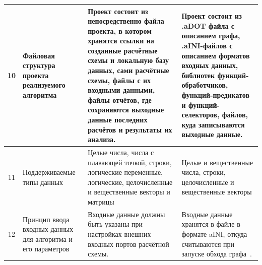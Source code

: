 \begin{landscape}
\begin{longtable}{|c|p{}|p{}|p{}|}
    \hline
    10         & Файловая структура проекта реализуемого алгоритма                                          & Проект состоит из непосредственно файла проекта, в котором хранятся ссылки на созданные расчётные схемы и локальную базу данных, сами расчётные схемы, файлы с их входными данными, файлы отчётов, где сохраняются выходные данные последних расчётов и результаты их анализа.                                                                                                                                                                                                                                                                                                                                                                  & Проект состоит из \textsf{.aDOT} файла с описанием графа, \textsf{.aINI}-файлов с описанием форматов входных данных, библиотек функций-обработчиков, функций-предикатов и функций-селекторов, файлов, куда записываются выходные данные.                                          \\
    \hline
    11         & Поддерживаемые типы данных                                                                 & Целые числа, числа с плавающей точкой, строки, логические переменные, логические, целочисленные и вещественные векторы и матрицы                                                                                                                                                                                                                                                                                                                                                                                                                                                                                                                & Целые и вещественные числа, строки, целочисленные и вещественные векторы                                                                                                                                                                                                          \\
    \hline
    12         & Принцип ввода входных данных для алгоритма и его параметров                                & Входные данные должны быть указаны при настройках внешних входных портов расчётной схемы.                                                                                                                                                                                                                                                                                                                                                                                                                                                                                                                                                       & Входные данные хранятся в файле в формате \gls{aINI}\cite{SokAINI}, откуда считываются при запуске обхода графа~\cite{SokolovPershin2017}.                                                                                                                                        \\

\end{longtable}
\end{landscape}

